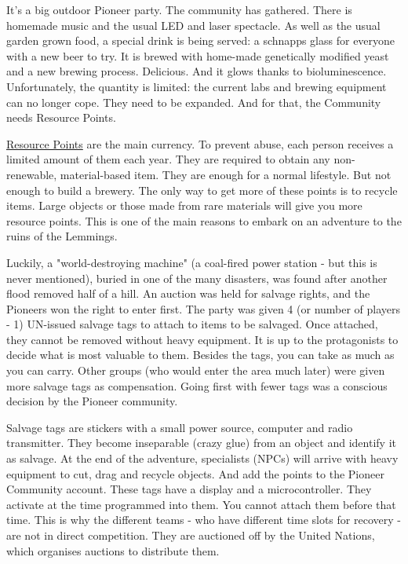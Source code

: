 It's a big outdoor Pioneer party. The community has gathered. There is homemade music and the usual LED and laser spectacle. As well as the usual garden grown food, a special drink is being served: a schnapps glass for everyone with a new beer to try.
It is brewed with home-made genetically modified yeast and a new brewing process. Delicious. And it glows thanks to bioluminescence. Unfortunately, the quantity is limited: the current labs and brewing equipment can no longer cope. They need to be expanded. And for that, the Community needs Resource Points.

\begin{sidebarBox}[title=Resource points]
\hyperref[sec:Resource Points]{Resource Points} are the main currency. To prevent abuse, each person receives a limited amount of them each year. They are required to obtain any non-renewable, material-based item. They are enough for a normal lifestyle. But not enough to build a brewery. The only way to get more of these points is to recycle items. Large objects or those made from rare materials will give you more resource points. This is one of the main reasons to embark on an adventure to the ruins of the Lemmings.
\end{sidebarBox}

Luckily, a "world-destroying machine" (a coal-fired power station - but this is never mentioned), buried in one of the many disasters, was found after another flood removed half of a hill. An auction was held for salvage rights, and the Pioneers won the right to enter first.
The party was given 4 (or number of players - 1) UN-issued salvage tags to attach to items to be salvaged. Once attached, they cannot be removed without heavy equipment. It is up to the protagonists to decide what is most valuable to them. Besides the tags, you can take as much as you can carry.
Other groups (who would enter the area much later) were given more salvage tags as compensation. Going first with fewer tags was a conscious decision by the Pioneer community.

\begin{sidebarBox}[title=Salvage tags]
Salvage tags are stickers with a small power source, computer and radio transmitter. They become inseparable (crazy glue) from an object and identify it as salvage. At the end of the adventure, specialists (NPCs) will arrive with heavy equipment to cut, drag and recycle objects. And add the points to the Pioneer Community account.
These tags have a display and a microcontroller. They activate at the time programmed into them. You cannot attach them before that time. This is why the different teams - who have different time slots for recovery - are not in direct competition. They are auctioned off by the United Nations, which organises auctions to distribute them.
\end{sidebarBox}

